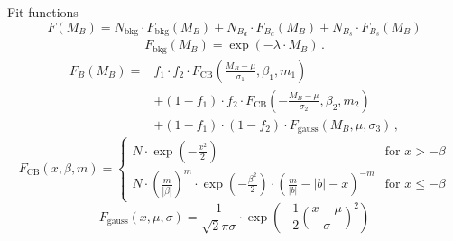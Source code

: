 \documentclass[aspectratio=1610, 10pt]{beamer}
\begin{document}
\begin{frame}{Fit functions}
  \begin{equation*}
    F(M_B) = N_\text{bkg} \cdot F_\text{bkg}(M_B) + N_{B_d} \cdot F_{B_d}(M_B) + N_{B_s} \cdot F_{B_s}(M_B)
  \end{equation*}
  \begin{align*}
    F_\text{bkg}(M_B) = \exp(-\lambda \cdot M_B) \, .
  \end{align*}
  \begin{align*}
    F_B(M_B) = &f_1 \cdot f_2 \cdot F_\text{CB}\left(\frac{M_B-\mu}{\sigma_1}, \beta_1, m_1\right) \nonumber\\
                &+ (1-f_1) \cdot f_2 \cdot F_\text{CB}\left(-\frac{M_B-\mu}{\sigma_2}, \beta_2, m_2\right) \nonumber\\
                &+ (1-f_1) \cdot (1-f_2) \cdot F_\text{gauss}\left(M_B,\mu,\sigma_3\right) \, , \label{eqn:FB}
  \end{align*}
  \begin{equation*}
    F_\text{CB}(x,\beta,m) = 
    \begin{cases}
        N \cdot \exp(-\frac{x^2}{2}) & \text{for } x > -\beta \\
        N \cdot \left(\frac{m}{|\beta|}\right)^m \cdot \exp\left(-\frac{\beta^2}{2}\right) \cdot \left(\frac{m}{|b|}-|b| - x\right)^{-m} & \text{for } x \leq -\beta
    \end{cases}
  \end{equation*}
  \begin{equation*}
    F_\text{gauss}\left(x,\mu,\sigma\right) = \frac{1}{\sqrt{2}\pi\sigma} \cdot \exp\left(-\frac{1}{2}\left(\frac{x-\mu}{\sigma}\right)^2\right)
  \end{equation*}
\end{frame}
\end{document}
